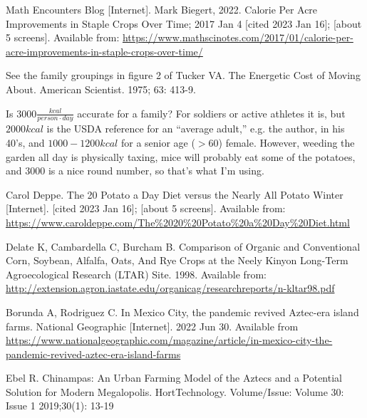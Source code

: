 \documentclass[12pt]{iopart}
\begin{document}
\begin{thebibliography}{99}

Math Encounters Blog [Internet].
Mark Biegert, 2022.
Calorie Per Acre Improvements in Staple Crops Over Time;
2017 Jan 4 [cited 2023 Jan 16]; [about 5 screens].
Available from: \url{https://www.mathscinotes.com/2017/01/calorie-per-acre-improvements-in-staple-crops-over-time/}



See the family groupings in figure 2 of 
Tucker VA.
The Energetic Cost of Moving About.
American Scientist.
1975; 63: 413-9.

Is $3000\frac{kcal}{person\cdot day}$ accurate for a family?  For soldiers or active athletes it is, but $2000kcal$ is the USDA reference for an ``average adult,'' e.g. the author, in his 40's, and   $1000-1200kcal$ for a senior age ($>60$) female.  However, weeding the garden all day is physically taxing, mice will probably eat some of the potatoes, and $3000$ is a nice round number, so that's what I'm using.

Carol Deppe.
The 20 Potato a Day Diet versus the Nearly All Potato Winter [Internet].
[cited 2023 Jan 16]; [about 5 screens].
Available from: 
\url{https://www.caroldeppe.com/The\%2020\%20Potato\%20a\%20Day\%20Diet.html}


Delate K, Cambardella C, Burcham B.
Comparison of Organic and Conventional Corn, 
Soybean, Alfalfa, Oats, And Rye Crops at the Neely Kinyon Long-Term Agroecological Research (LTAR) Site.
1998.
Available from: \url{http://extension.agron.iastate.edu/organicag/researchreports/n-kltar98.pdf} 

Borunda A, Rodriguez C.
In Mexico City, the pandemic revived Aztec-era island farms.
National Geographic [Internet].
2022 Jun 30.
Available from \url{https://www.nationalgeographic.com/magazine/article/in-mexico-city-the-pandemic-revived-aztec-era-island-farms}

Ebel R.
Chinampas: An Urban Farming Model of the Aztecs and a Potential Solution for Modern Megalopolis.
HortTechnology.
Volume/Issue: Volume 30: Issue 1
2019;30(1): 13-19


\end{thebibliography}
\end{document}
